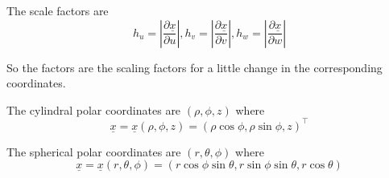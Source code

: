 \begin{definition}
    The scale factors are
    $$h_{u}=\left|\frac{\partial \underline{x}}{\partial u}\right|,h_{v}=\left|\frac{\partial \underline{x}}{\partial v}\right|,h_{w}=\left|\frac{\partial \underline{x}}{\partial w}\right|$$
\end{definition}
So the factors are the scaling factors for a little change in the corresponding coordinates.
\begin{definition}
    The cylindral polar coordinates are $(\rho,\phi,z)$ where
    $$\underline{x}=\underline{x}(\rho,\phi,z)=(\rho\cos\phi,\rho\sin\phi,z)^\top$$
\end{definition}
\begin{definition}
    The spherical polar coordinates are $(r,\theta,\phi)$ where
    $$\underline{x}=\underline{x}(r,\theta,\phi)=(r\cos\phi\sin\theta, r\sin\phi\sin\theta,r\cos\theta)$$
\end{definition}

